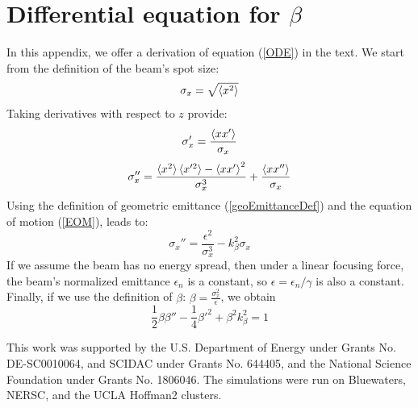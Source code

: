 \documentclass[%
reprint, superscriptaddress,
 amsmath,amssymb, aps,
prstab,
]{revtex4-2}
\begin{document}
\section{Differential equation for $\beta$}
In this appendix, we offer a derivation of equation (\ref{ODE})  in the text.
We start from the definition of the beam's spot size:
\[
	\sigma_x = \sqrt{\braket{x^2}}
\]
Taking derivatives with respect to $z$ provide:
\[
	 \sigma_x' = \frac{\braket{xx'}}{\sigma_x}
\]
\[
	\sigma_x'' = \frac{\braket{x^2}\braket{x'^2} - \braket{xx'}^2}{\sigma_x^3} + \frac{\braket{xx''}}{\sigma_x}
\]
 Using the definition of geometric emittance (\ref{geoEmittanceDef}) and the equation of motion (\ref{EOM}), leads to:
 \[
 	\sigma_x'' = \frac{\epsilon^2}{\sigma_x^3} - k_\beta^2 \sigma_x
 \]
If we assume the beam has no energy spread, then under a linear focusing force, the beam's normalized emittance $\epsilon_n$ is a constant, so $\epsilon = \epsilon_n / \gamma$ is also a constant. Finally, if we use the definition of $\beta$: $\beta = \frac{\sigma_x^2}{\epsilon}$, we obtain
\[
\frac{1}{2} \beta \beta'' -\frac{1}{4} \beta'^2 + \beta^2 k_\beta^2 = 1
\]
\begin{acknowledgments} This work was supported by the U.S. Department of
Energy under Grants No. DE-SC0010064, and SCIDAC under Grants No. 644405, and the National Science Foundation under Grants No. 1806046. The simulations were run on Bluewaters, NERSC, and the UCLA Hoffman2 clusters. \end{acknowledgments}
% 

\end{document}
